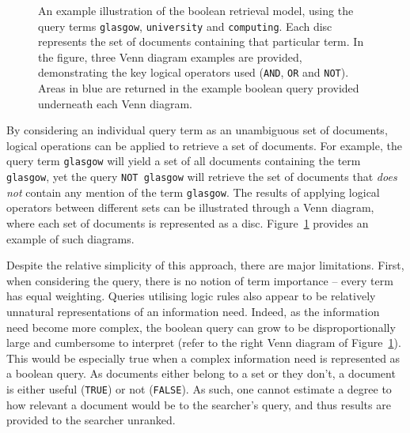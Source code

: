 \begin{figure}[t!]
    \centering
    \caption[Venn diagrams illustrating boolean retrieval]{An example illustration of the boolean retrieval model, using the query terms \texttt{glasgow}, \texttt{university} and \texttt{computing}. Each disc represents the set of documents containing that particular term. In the figure, three Venn diagram examples are provided, demonstrating the key logical operators used (\texttt{AND}, \texttt{OR} and \texttt{NOT}). Areas in blue are returned in the example boolean query provided underneath each Venn diagram.}
    \label{fig:boolean}
\end{figure}

By considering an individual query term as an unambiguous set of documents, logical operations can be applied to retrieve a set of documents. For example, the query term \texttt{glasgow} will yield a set of all documents containing the term \texttt{glasgow}, yet the query \texttt{NOT glasgow} will retrieve the set of documents that \emph{does not} contain any mention of the term \texttt{glasgow}. The results of applying logical operators between different sets can be illustrated through a Venn diagram, where each set of documents is represented as a disc. Figure~\ref{fig:boolean} provides an example of such diagrams.

Despite the relative simplicity of this approach, there are major limitations. First, when considering the query, there is no notion of term importance -- every term has equal weighting. Queries utilising logic rules also appear to be relatively unnatural representations of an information need. Indeed, as the information need become more complex, the boolean query can grow to be disproportionally large and cumbersome to interpret (refer to the right Venn diagram of Figure~\ref{fig:boolean}). This would be especially true when a complex information need is represented as a boolean query. As documents either belong to a set or they don't, a document is either useful (\texttt{TRUE}) or not (\texttt{FALSE}). As such, one cannot estimate a degree to how relevant a document would be to the searcher's query, and thus results are provided to the searcher unranked.

